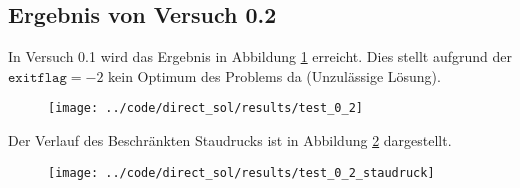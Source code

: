 \subsection{Ergebnis von Versuch 0.2}\label{kap:Versuch02}
In Versuch 0.1 wird das Ergebnis in Abbildung \ref{img:test_0_2} erreicht. Dies stellt aufgrund der $\texttt{exitflag} = -2$ kein Optimum des Problems da (Unzulässige Lösung).
\begin{figure}[H]
\begin{center}
\texttt{[image: ../code/direct\_sol/results/test\_0\_2]}
 \label{img:test_0_2}
\end{center}
\end{figure}
Der Verlauf des Beschränkten Staudrucks ist in Abbildung \ref{img:test_0_2_staudruck} dargestellt.
\begin{figure}[H]
\begin{center}
\texttt{[image: ../code/direct\_sol/results/test\_0\_2\_staudruck]}
\label{img:test_0_2_staudruck}
\end{center}
\end{figure}











\newpage
